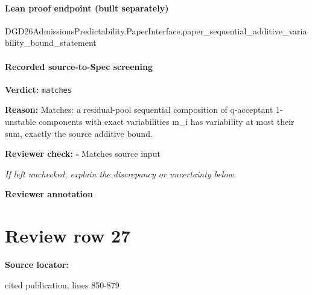 \documentclass[10pt]{article}
\newcommand{\reviewerbox}{%
  \par\noindent\fbox{\parbox{0.96\linewidth}{\rule{0pt}{0.38in}}}\par
}
\newcommand{\reviewmatch}[1]{%
  \par\noindent\textbf{Reviewer check:} $\square$\; #1\par
  \noindent\emph{If left unchecked, explain the discrepancy or uncertainty below.}\par
}
\begin{document}
\paragraph{Lean proof endpoint (built separately)}\begin{ReviewVerbatim}
DGD26AdmissionsPredictability.PaperInterface.paper_sequential_additive_variability_bound_statement
\end{ReviewVerbatim}

\paragraph{Recorded source-to-Spec screening}
\textbf{Verdict:} \texttt{matches}
\\
{\raggedright
\textbf{Reason:} Matches:\allowbreak{} a residual-\allowbreak{}pool sequential composition of q-\allowbreak{}acceptant 1-\allowbreak{}unstable components with exact variabilities m\_\allowbreak{}i has variability at most their sum, exactly the source additive bound.\allowbreak{}
\par}
\reviewmatch{Matches source input}
\noindent\textbf{Reviewer annotation}\par
\reviewerbox
\clearpage
\hypertarget{source-claim-fff538b4a617e0f3}{}
\section*{Review row 27}
\textbf{Source locator:} {\footnotesize\raggedright cited publication, lines 850-\allowbreak{}879\par}
\end{document}
